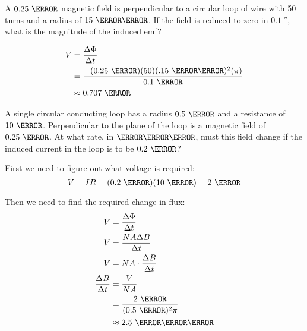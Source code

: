 \documentclass[fleqn,addpoints]{exam}
\begin{document}
\begin{questions}
\question[5]
A $0.25 \ \tesla$ magnetic field is perpendicular to a circular loop of wire with 50 turns and a radius of $15
\ \centi\meter$.  If the field is reduced to zero in $0.1 \ \second$, what is the magnitude of the induced emf?

\begin{solution}
\begin{align*}
  V &= \frac{\Delta \Phi}{\Delta t} \\
           &= \frac{- (0.25 \ \tesla)(50)(.15 \ \centi \meter)^2(\pi)}{0.1 \ \second} \\
           &\approx 0.707 \ \volt \\
\end{align*}
\end{solution}
 
\bonusquestion[5]
A single circular conducting loop has a radius $0.5 \ \meter$ and a resistance of $10 \ \ohm$.  Perpendicular
to the plane of the loop is a magnetic field of $0.25 \ \tesla$.  At what rate, in $\tesla \per \second$, must this
field change if the induced current in the loop is to be $0.2 \ \ampere$?

\begin{solution}
First we need to figure out what voltage is required:
\[
  V = IR = (0.2 \ \ampere)(10 \ \ohm) = 2 \ \volt
\]

Then we need to find the required change in flux:
\begin{align*}
  V &= \frac{\Delta \Phi}{\Delta t} \\
  V &= \frac{NA \Delta B}{\Delta t} \\
  V &= NA \cdot \frac{\Delta B}{\Delta t} \\
  \frac{\Delta B}{\Delta t} &= \frac{V}{NA} \\
  &= \frac{2 \ \volt}{(0.5 \ \meter)^2 \pi} \\
  &\approx 2.5 \ \tesla \per \second \\  
\end{align*}
\end{solution}

\end{questions}
\end{document}
